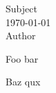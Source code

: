 \documentclass{exam}
\begin{document}
\printanswers
\begingroup
    \centering
    \LARGE Subject\\
    \large \today\\[0.5em]
    \large Author\\
\endgroup
\pointsdroppedatright

\begin{questions}
    \question Foo bar\\
    \begin{solution}
        Baz qux\\
    \end{solution}
\end{questions}
\end{document}
